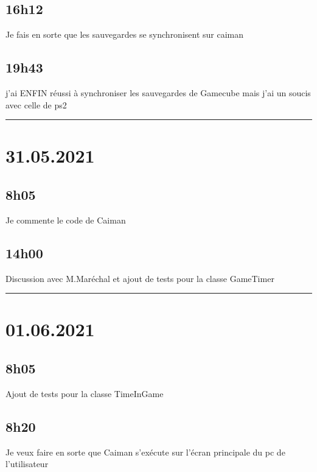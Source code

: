 \documentclass[a4paper,12pt,french]{sphinxmanual}
\begin{document}
\subsection{16h12}
\label{\detokenize{logbook:h12}}
\sphinxAtStartPar
Je fais en sorte que les sauvegardes se synchronisent sur caiman


\subsection{19h43}
\label{\detokenize{logbook:h43}}
\sphinxAtStartPar
j’ai ENFIN réussi à synchroniser les sauvegardes de Gamecube mais j’ai un soucis avec celle de ps2


\bigskip\hrule\bigskip



\section{31.05.2021}
\label{\detokenize{logbook:id175}}

\subsection{8h05}
\label{\detokenize{logbook:id176}}
\sphinxAtStartPar
Je commente le code de Caiman


\subsection{14h00}
\label{\detokenize{logbook:id177}}
\sphinxAtStartPar
Discussion avec M.Maréchal et ajout de tests pour la classe GameTimer


\bigskip\hrule\bigskip



\section{01.06.2021}
\label{\detokenize{logbook:id178}}

\subsection{8h05}
\label{\detokenize{logbook:id179}}
\sphinxAtStartPar
Ajout de tests pour la classe TimeInGame


\subsection{8h20}
\label{\detokenize{logbook:id180}}
\sphinxAtStartPar
Je veux faire en sorte que Caiman s’exécute sur l’écran principale du pc de l’utilisateur
\end{document}
